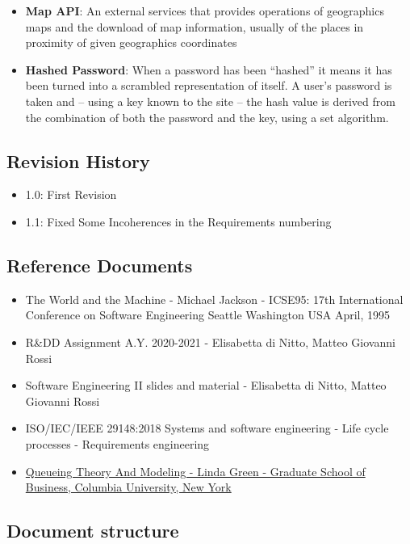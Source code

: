 \begin{itemize}
      \item \textbf{Map API}: An external services that provides operations of geographics maps and the download of map information, usually of the places in proximity of given geographics coordinates
      \item \textbf{Hashed Password}: When a password has been “hashed” it means it has been turned into a scrambled representation of itself. A user's password is taken and – using a key known to the site – the hash value is derived from the combination of both the password and the key, using a set algorithm.
\end{itemize}
\subsection{Revision History}
\begin{itemize}
      \item 1.0: First Revision
      \item 1.1: Fixed Some Incoherences in the Requirements numbering
\end{itemize}
\subsection{Reference Documents}

\begin{itemize}
      \item The World and the Machine - Michael Jackson - ICSE95: 17th International Conference on Software Engineering Seattle Washington USA April, 1995
      \item R\&DD Assignment A.Y. 2020-2021 - Elisabetta di Nitto, Matteo Giovanni Rossi
      \item Software Engineering II slides and material - Elisabetta di Nitto, Matteo Giovanni Rossi
      \item ISO/IEC/IEEE 29148:2018 Systems and software engineering - Life cycle processes - Requirements engineering
      \item \href{https://www0.gsb.columbia.edu/mygsb/faculty/research/pubfiles/5474/queueing%20theory%20and%20modeling.pdf}{Queueing Theory And Modeling - Linda Green - Graduate School of Business, Columbia University, New York}
\end{itemize}
\clearpage
\subsection{Document structure}

